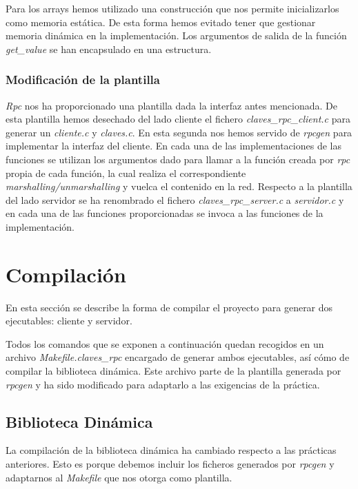 \documentclass[]{article}
\begin{document}
Para los arrays hemos utilizado una construcción que nos permite inicializarlos como memoria estática. De esta forma hemos evitado tener que gestionar memoria dinámica en la implementación. Los argumentos de salida de la función \textit{get\_value} se han encapsulado en una estructura.  

\subsubsection{Modificación de la plantilla}
\label{subsec::modificacion_plantilla}

\textit{Rpc} nos ha proporcionado una plantilla dada la interfaz antes mencionada. De esta plantilla hemos desechado del lado cliente el fichero \textit{claves\_rpc\_client.c} para generar un \textit{cliente.c} y \textit{claves.c}. En esta segunda nos hemos servido de \textit{rpcgen} para implementar la interfaz del cliente. En cada una de las implementaciones de las funciones se utilizan los argumentos dado para llamar a la función creada por \textit{rpc} propia de cada función, la cual realiza el correspondiente \textit{marshalling/unmarshalling} y vuelca el contenido en la red.
Respecto a la plantilla del lado servidor se ha renombrado el fichero \textit{claves\_rpc\_server.c} a \textit{servidor.c} y en cada una de las funciones proporcionadas se invoca a las funciones de la implementación.

\section{Compilación}
\label{sec:compilacion}
En esta sección se describe la forma de compilar el proyecto para generar dos ejecutables: cliente y servidor.

Todos los comandos que se exponen a continuación quedan recogidos en un archivo \textit{Makefile.claves\_rpc} encargado de generar ambos ejecutables, así cómo de compilar la biblioteca dinámica. Este archivo parte de la plantilla generada por \textit{rpcgen} y ha sido modificado para adaptarlo a las exigencias de la práctica.  

\subsection{Biblioteca Dinámica}
\label{subsec:biblioteca}
La compilación de la biblioteca dinámica ha cambiado respecto a las prácticas anteriores. Esto es porque debemos incluir los ficheros generados por \textit{rpcgen} y adaptarnos al \textit{Makefile} que nos otorga como plantilla.
\end{document}

